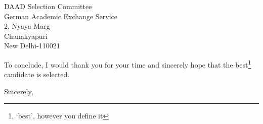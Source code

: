 \documentclass{letter}
\begin{document}
\begin{letter}{DAAD Selection Committee\\German Academic Exchange Service\\2, Nyaya Marg\\Chanakyapuri\\New Delhi-110021}
\begin{enumerate}





\end{enumerate}


To conclude, I would thank you for your time and sincerely hope that the best\footnote{`best', however you define it} candidate is selected.


\vspace{2\parskip} %
\closing{Sincerely,}
\vspace{2\parskip} %




\end{letter}
 
\end{document}
